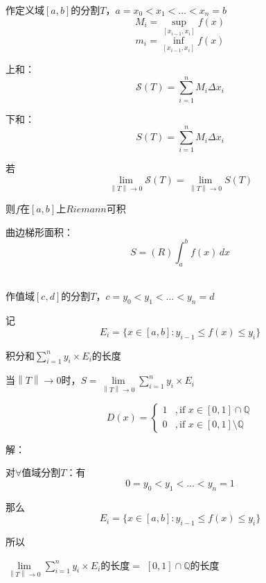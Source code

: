 \newpage
{}
\begin{eg}
\end{eg}
\noindent {}
\par
作定义域$[a,b]$的分割$T$，$a = x_{0} < x_{1} < \dots <x_{n} = b$
\[M_{i} = \sup \limits_{[x_{i-1},x_{i}]}f(x)\]
\[m_{i} = \inf \limits_{[x_{i-1},x_{i}]}f(x)\]
\par
上和：\[\mathcal{S}(T) = \sum \limits_{i = 1}^{n}M_{i}\Delta x_{i}\]
\par
下和：\[S(T) = \sum \limits_{i = 1}^{n}M_{i}\Delta x_{i}\]
\par
若\[\lim \limits_{\left\lVert T\right\rVert  \to 0} \mathcal{S}(T) =  \lim \limits_{\left\lVert T\right\rVert  \to 0} S(T)\]
\par
则$f$在$[a,b]$上$Riemann$可积
\par
曲边梯形面积：\[S = (R) \int_{a}^{b} f(x) \,dx \]
\\
\par
作值域$[c,d]$的分割$T$，$c = y_{0} < y_{1} < \dots <y_{n} = d$
\par
记
\[E_{i} = \{x \in [a,b] : y_{i-1} \leqslant f(x) \leqslant y_{i}\}\]
\par
积分和$\sum \limits_{i = 1}^{n} y_{i} \times E_{i} $的长度
\par
当$\left\lVert T \right\rVert \to 0$时，$S=\lim \limits_{\left\lVert T\right\rVert  \to 0} \sum \limits_{i = 1}^{n} y_{i} \times E_{i}$
\begin{eg}
\[ D(x) = 
\begin{cases} 
    1 & ,\text{if } x \in  [0,1] \cap \mathbb{Q} \\ 
    0 & ,\text{if } x \in [0,1]\setminus \mathbb{Q} 
\end{cases} \]
\end{eg}
\noindent 解：
\par
对$\forall$值域分割$T$：有
\[0 = y_{0} < y_{1} < \dots <y_{n} = 1\]
\par
那么
\[E_{i} = \{x \in [a,b] : y_{i-1} \leqslant f(x) \leqslant y_{i}\}\]
\par
所以
\begin{center}
$\lim \limits_{\left\lVert T\right\rVert  \to 0} \sum \limits_{i = 1}^{n} y_{i} \times E_{i}$的长度$=$ $[0,1] \cap \mathbb{Q} $的长度
\end{center}

